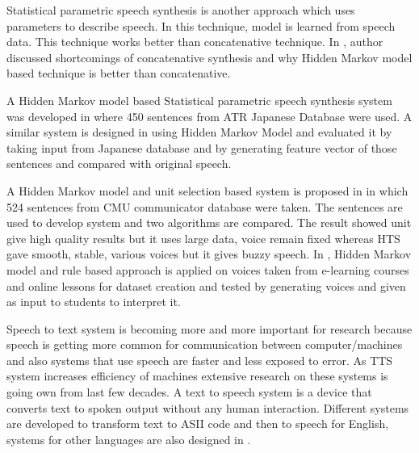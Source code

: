 Statistical parametric speech synthesis is another approach which uses parameters to describe
speech. In this technique, model is learned from speech data. This technique works better than
concatenative technique. In \cite{merritt2013investigating}, author discussed shortcomings of concatenative
synthesis and why Hidden Markov model based technique is better than concatenative.

A Hidden Markov model based Statistical parametric speech synthesis system was developed in
\cite{yoshimura1998duration} where 450 sentences from ATR Japanese Database were used.  A similar system is designed in 
\cite{tokuda2000speech} using Hidden Markov Model and evaluated it by taking input
from Japanese database and by generating feature vector of those sentences and compared with
original speech.


A Hidden Markov model and unit selection based system is proposed in \cite{tokuda2002hmm} in which
524 sentences from CMU communicator database were taken. The sentences are used to develop
system and two algorithms are compared. The result showed unit give high quality results but it
uses large data, voice remain fixed whereas HTS gave smooth, stable, various voices but it gives
buzzy speech. In \cite{harashima2006review}, Hidden Markov model and rule based approach is applied 
on voices taken from e-learning courses and online lessons for dataset creation and tested by
generating voices and given as input to students to interpret it.


Speech to text system is becoming more and more important for research because speech is getting
more common for communication between computer/machines and also systems that use speech
are faster and less exposed to error. As TTS system increases efficiency of machines extensive
research on these systems is going own from last few decades. A text to speech system is a device
that converts text to spoken output without any human interaction. Different systems are developed
to transform text to ASII code and then to speech for English, systems for other languages are also
designed in \cite{carlson1982multi}.





















